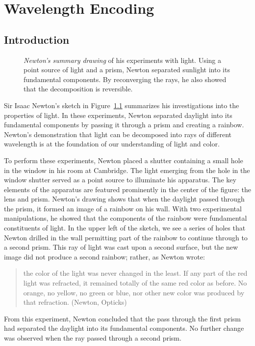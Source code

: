 \chapter{Wavelength Encoding}
\label{chapter:wavelength}
\section{Introduction}

\begin{figure}
\centerline {
}
\caption[Newton's Experiments]{
{\em Newton's summary drawing} of his experiments with light.
Using a point source of light and a prism, Newton separated sunlight
into its fundamental components.
By reconverging the rays, he 
also showed that the decomposition is reversible.
}
\label{f3:newton}
\end{figure}
Sir Isaac Newton's sketch in Figure~\ref{f3:newton}
summarizes his investigations into the
properties of light.
In these experiments, Newton separated daylight into
its fundamental components
by passing it through a prism and creating a rainbow.
Newton's demonstration that
light can be decomposed into rays
of different wavelength is at the foundation
of our understanding of light and color.

To perform these experiments, Newton placed a shutter 
containing a small hole in the window 
in his room at Cambridge.
The light emerging from the hole in the window
shutter served as a point source to illuminate his apparatus.
The key elements of the
apparatus are featured prominently in the center
of the figure: the lens and prism.
Newton's drawing shows that when
the daylight passed through the prism,
it formed an image of a rainbow on his wall.
With two experimental manipulations,
he showed that the components of the rainbow
were fundamental constituents of light.
In the upper left of the sketch,
we see a series of holes that Newton drilled in the wall
permitting part of the rainbow to continue through
to a second prism.
This ray of light was cast upon a second surface,
but the new image did not produce a second rainbow;
rather, as Newton wrote:
\begin{quote}
the color of the light was never changed in the least.
If any part of the red light was refracted, it remained totally
of the same red color as before.
No orange, no yellow, no green or blue, nor other new color was
produced by that refraction.
(Newton, Opticks)
\end{quote}
From this experiment, Newton concluded that
the pass through the first prism had
separated the daylight into its fundamental components.
No further change was observed when the ray passed
through a second prism.


